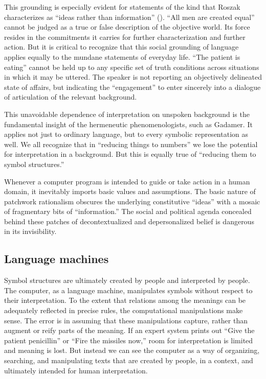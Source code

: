 \documentclass[12pt]{article}
\begin{document}
This grounding is especially evident for statements of the kind that Roszak characterizes as ``ideas rather than information'' (\cite{roszak1986}). ``All men are created equal'' cannot be judged as a true or false description of the objective world. Its force resides in the commitments it carries for further characterization and further action. But it is critical to recognize that this social grounding of language applies equally to the mundane statements of everyday life. ``The patient is eating'' cannot be held up to any specific set of truth conditions across situations in which it may be uttered. The speaker is not reporting an objectively delineated state of affairs, but indicating the ``engagement'' to enter sincerely into a dialogue of articulation of the relevant background.

This unavoidable dependence of interpretation on unspoken background is the fundamental insight of the hermeneutic phenomenologists, such as Gadamer. It applies not just to ordinary language, but to every symbolic representation as well. We all recognize that in ``reducing things to numbers'' we lose the potential for interpretation in a background. But this is equally true of ``reducing them to symbol structures.''

Whenever a computer program is intended to guide or take action in a human domain, it inevitably imports basic values and assumptions. The basic nature of patchwork rationalism obscures the underlying constitutive ``ideas'' with a mosaic of fragmentary bits of ``information.'' The social and political agenda concealed behind these patches of decontextualized and depersonalized belief is dangerous in its invisibility.

\subsection{Language machines}

Symbol structures are ultimately created by people and interpreted by people. The computer, as a language machine, manipulates symbols without respect to their interpretation. To the extent that relations among the meanings can be adequately reflected in precise rules, the computational manipulations make sense. The error is in assuming that these manipulations capture, rather than augment or reify parts of the meaning. If an expert system prints out ``Give the patient penicillin'' or ``Fire the missiles now,'' room for interpretation is limited and meaning is lost. But instead we can see the computer as a way of organizing, searching, and manipulating texts that are created by people, in a context, and ultimately intended for human interpretation.
\end{document}
